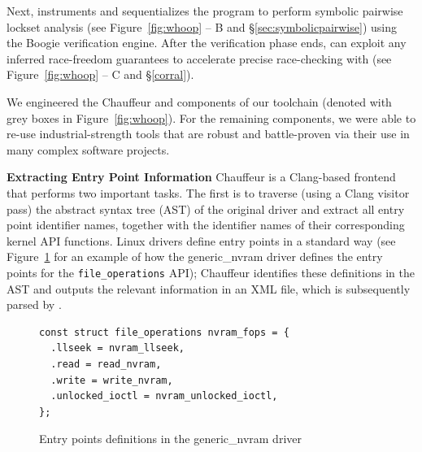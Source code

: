 Next, \whoop instruments and sequentializes the program to perform symbolic pairwise lockset analysis (see Figure~\ref{fig:whoop} -- B and \S\ref{sec:symbolicpairwise}) using the Boogie verification engine. After the verification phase ends, \whoop can exploit any inferred race-freedom guarantees to accelerate precise race-checking with \corral (see Figure~\ref{fig:whoop} -- C and \S\ref{corral}).

We engineered the Chauffeur and \whoop components of our toolchain (denoted with grey boxes in Figure~\ref{fig:whoop}).  For the remaining components, we were able to re-use industrial-strength tools that are robust and battle-proven via their use in many complex software projects.

\medskip\noindent\textbf{Extracting Entry Point Information }
%
Chauffeur is a Clang-based frontend that performs two important tasks. The first is to traverse (using a Clang visitor pass) the abstract syntax tree (AST) of the original driver and extract all entry point identifier names, together with the identifier names of their corresponding kernel API functions. Linux drivers define entry points in a standard way (see Figure~\ref{fig:entrypoints} for an example of how the generic\_nvram driver defines the entry points for the \texttt{file\_operations} API); Chauffeur identifies these definitions in the AST and outputs the relevant information in an XML file, which is subsequently parsed by \whoop.

\begin{figure}[t]
\begin{lstlisting}
const struct file_operations nvram_fops = {
  .llseek = nvram_llseek,
  .read = read_nvram,
  .write = write_nvram,
  .unlocked_ioctl = nvram_unlocked_ioctl,
};
\end{lstlisting}
\caption{Entry points definitions in the generic\_nvram driver}
\label{fig:entrypoints}
\end{figure}

